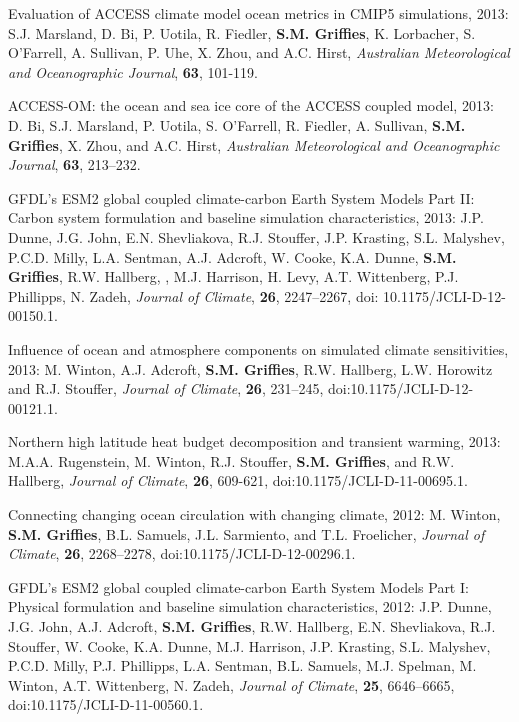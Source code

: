 \begin{etaremune}
\item Evaluation of ACCESS climate model ocean metrics in CMIP5
  simulations, 2013: S.J. Marsland, D. Bi, P. Uotila, R. Fiedler, {\bf
    S.M. Grif\/f\/ies}, K. Lorbacher, S. O'Farrell, A. Sullivan,
  P. Uhe, X. Zhou, and A.C. Hirst, {\it Australian Meteorological and
    Oceanographic Journal}, {\bf 63}, 101-119.

\item ACCESS-OM: the ocean and sea ice core of the ACCESS coupled
  model, 2013: D. Bi, S.J. Marsland, P. Uotila, S. O'Farrell,
  R. Fiedler, A. Sullivan, {\bf S.M. Grif\/f\/ies}, X. Zhou, and
  A.C. Hirst, {\it Australian Meteorological and Oceanographic
    Journal}, {\bf 63}, 213--232.

\item GFDL’s ESM2 global coupled climate-carbon Earth System Models
  Part II: Carbon system formulation and baseline simulation
  characteristics, 2013: J.P. Dunne, J.G. John, E.N. Shevliakova,
  R.J. Stouffer, J.P. Krasting, S.L. Malyshev, P.C.D. Milly,
  L.A. Sentman, A.J. Adcroft, W. Cooke, K.A. Dunne, {\bf
    S.M. Griffies}, R.W. Hallberg, , M.J. Harrison, H. Levy,
  A.T. Wittenberg, P.J. Phillipps, N. Zadeh, {\it Journal of Climate},
  {\bf 26}, 2247--2267, doi: 10.1175/JCLI-D-12-00150.1.

\item Influence of ocean and atmosphere components on simulated
  climate sensitivities, 2013: M. Winton, A.J. Adcroft, {\bf
    S.M. Grif\/f\/ies}, R.W. Hallberg, L.W. Horowitz and
  R.J. Stouffer, {\it Journal of Climate}, {\bf 26}, 231--245,
  doi:10.1175/JCLI-D-12-00121.1.

\item Northern high latitude heat budget decomposition and transient
  warming, 2013: M.A.A. Rugenstein, M. Winton, R.J. Stouffer, {\bf
    S.M. Griffies}, and R.W. Hallberg, {\it Journal of Climate}, {\bf 26}, 609-621, doi:10.1175/JCLI-D-11-00695.1.

\item Connecting changing ocean circulation with changing climate,
  2012: M. Winton, {\bf S.M. Grif\/f\/ies}, B.L. Samuels,
  J.L. Sarmiento, and T.L. Froelicher, {\it Journal of Climate}, {\bf 26}, 2268--2278, doi:10.1175/JCLI-D-12-00296.1.

\item GFDL’s ESM2 global coupled climate-carbon Earth System Models
  Part I: Physical formulation and baseline simulation
  characteristics, 2012: J.P. Dunne, J.G. John, A.J. Adcroft, {\bf
    S.M. Griffies}, R.W. Hallberg, E.N. Shevliakova, R.J. Stouffer,
  W. Cooke, K.A. Dunne, M.J. Harrison, J.P. Krasting, S.L. Malyshev,
  P.C.D. Milly, P.J. Phillipps, L.A. Sentman, B.L. Samuels,
  M.J. Spelman, M. Winton, A.T. Wittenberg, N. Zadeh, {\it Journal of
    Climate}, {\bf 25}, 6646--6665,
doi:10.1175/JCLI-D-11-00560.1.


\end{etaremune}
